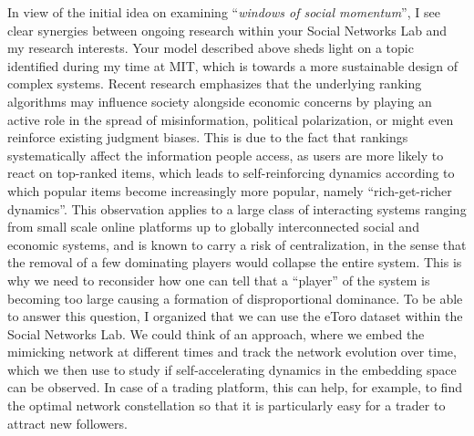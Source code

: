 In view of the initial idea on examining ``\textit{windows of social momentum}'', I see clear synergies between ongoing research within your Social Networks Lab and my research interests. 
Your model described above sheds light on a topic identified during my time at MIT, which is towards a more sustainable design of complex systems. 
Recent research \cite{germano2019few} emphasizes that the underlying ranking algorithms may influence society alongside economic concerns by playing an active role in the spread of misinformation, political polarization, or might even reinforce existing judgment biases.
This is due to the fact that rankings systematically affect the information people access, as users are more likely to react on top-ranked items, which leads to self-reinforcing dynamics according to which popular items become increasingly more popular, namely ``rich-get-richer dynamics''. 
This observation applies to a large class of interacting systems ranging from small scale online platforms up to globally interconnected social and economic systems, and is known to carry a risk of centralization, in the sense that the removal of a few dominating players would collapse the entire system. 
This is why we need to reconsider how one can tell that a ``player'' of the system is becoming too large causing a formation of disproportional dominance. 
To be able to answer this question, I organized that we can use the eToro dataset within the Social Networks Lab.
We could think of an approach, where we embed the mimicking network at different times and track the network evolution over time, which we then use to study if self-accelerating dynamics in the embedding space can be observed. 
In case of a trading platform, this can help, for example, to find the optimal network constellation so that it is particularly easy for a trader to attract new followers.\\

